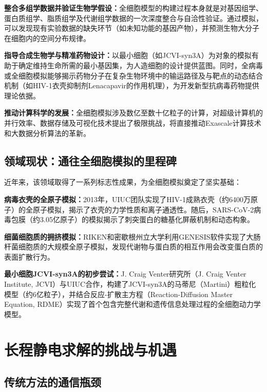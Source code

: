 \textbf{整合多组学数据并验证生物学假设：}全细胞模型的构建过程本身就是对基因组学、蛋白质组学、脂质组学及代谢组学数据的一次深度整合与自洽性验证。通过模拟，可以发现现有实验数据的缺失环节（如未知功能的基因产物），并预测生物大分子在细胞内的空间分布规律\cite{feig2023current}。

\textbf{指导合成生物学与精准药物设计：}以最小细胞（如JCVI-syn3A）为对象的模拟有助于确定维持生命所需的最小基因集，为人造细胞的设计提供蓝图。同时，全病毒或全细胞模拟能够揭示药物分子在复杂生物环境中的输运路径及与靶点的动态结合机制（如HIV-1衣壳抑制剂Lenacapavir的作用机理），为开发新型抗病毒药物提供理论依据\cite{lenner2023whole}。

\textbf{推动计算科学的发展：}全细胞模拟涉及数亿至数十亿粒子的计算，对超级计算机的并行效率、数据存储及可视化技术提出了极限挑战，将直接推动Exascale计算技术和大数据分析算法的革新\cite{feig2023current}。

\subsection{领域现状：通往全细胞模拟的里程碑}

近年来，该领域取得了一系列标志性成果，为全细胞模拟奠定了坚实基础：

\textbf{病毒衣壳的全原子模拟：}2013年，UIUC团队实现了HIV-1成熟衣壳（约6400万原子）的全原子模拟，揭示了衣壳的力学性质和离子通透性\cite{zhao2013mature}。随后，SARS-CoV-2病毒包膜（约3.05亿原子）的模拟揭示了刺突蛋白的糖基化屏蔽机制和动态构象\cite{casalino2020all}。

\textbf{细菌细胞质的拥挤模拟：}RIKEN和密歇根州立大学利用GENESIS软件实现了大肠杆菌细胞质的大规模全原子模拟，发现代谢物与蛋白质的相互作用会改变蛋白质的表面扩散行为\cite{feig2023current}。

\textbf{最小细胞JCVI-syn3A的初步尝试：}J. Craig Venter研究所（J. Craig Venter Institute, JCVI）与UIUC合作，构建了JCVI-syn3A的马蒂尼（Martini）粗粒化模型（约6亿粒子），并结合反应-扩散主方程（Reaction-Diffusion Master Equation, RDME）实现了首个包含完整代谢和遗传信息处理过程的全细胞动力学模型\cite{lenner2023whole}。

\section{长程静电求解的挑战与机遇}

\subsection{传统方法的通信瓶颈}

